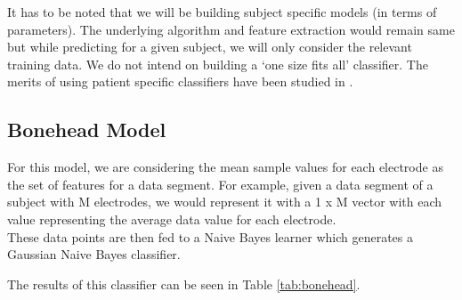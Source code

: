 \documentclass[a4paper]{article}
\begin{document}
It has to be noted that we will be building subject specific models (in terms of parameters). The underlying algorithm and feature extraction would remain same but while predicting for a given subject, we will only consider the relevant training data. We do not intend on building a `one size fits all' classifier. The merits of using patient specific classifiers have been studied in \cite{yunpark}.

\subsection{Bonehead Model}
For this model, we are considering the mean sample values for each electrode as the set of features for a data segment. For example, given a data segment of a subject with M electrodes, we would represent it with a 1 x M vector with each value representing the average data value for each electrode. \\
These data points are then fed to a Naive Bayes learner which generates a Gaussian Naive Bayes classifier.

The results of this classifier can be seen in Table \ref{tab:bonehead}.

\begin{table}[!htbp]
\centering
{}
\caption{Performance of the bonehead model.}
\label{tab:bonehead}
\end{table}
\end{document}
